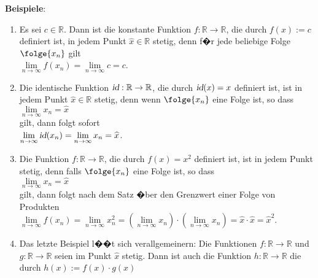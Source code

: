 \noindent
\textbf{Beispiele}:
\begin{enumerate}
\item Es sei $c \in \mathbb{R}$.  Dann ist die konstante Funktion
      $f: \mathbb{R} \rightarrow \mathbb{R}$, die durch $f(x) := c$ definiert ist, in
      jedem Punkt $\widehat{x}\in\mathbb{R}$ stetig, denn f�r jede beliebige Folge $\folge{x_n}$ gilt 
      \\[0.2cm]
      \hspace*{1.3cm}      
      $\lim\limits_{n\rightarrow\infty} f(x_n) = \lim\limits_{n\rightarrow\infty} c = c$.
\item Die identische Funktion $\textsl{id}:\mathbb{R} \rightarrow \mathbb{R}$, die durch 
      $\textsl{id}(x) = x$ definiert ist, ist in jedem Punkt $\widehat{x}\in\mathbb{R}$ stetig,
      denn wenn $\folge{x_n}$ eine Folge ist, so dass
      \\[0.2cm]
      \hspace*{1.3cm}      
      $\lim\limits_{n\rightarrow\infty} x_n = \widehat{x}$
      \\[0.2cm]
      gilt, dann folgt sofort 
      \\[0.2cm]
      \hspace*{1.3cm}      
      $\lim\limits_{n\rightarrow\infty} \textsl{id}(x_n) = \lim\limits_{n\rightarrow\infty} x_n = \widehat{x}$.
\item Die Funktion $f: \mathbb{R} \rightarrow \mathbb{R}$, die durch
      $f(x) = x^2$ definiert ist, ist in jedem Punkt stetig, denn falls
      $\folge{x_n}$ eine Folge ist, so dass 
      \\[0.2cm]
      \hspace*{1.3cm}      
      $\lim\limits_{n\rightarrow\infty} x_n = \widehat{x}$ 
      \\[0.2cm]
      gilt, dann folgt nach dem Satz �ber den Grenzwert einer Folge von Produkten
      \\[0.2cm]
      \hspace*{1.3cm}      
      $\lim\limits_{n\rightarrow\infty} f(x_n) = 
       \lim\limits_{n\rightarrow\infty} x_n^2 = 
       \left(\lim\limits_{n\rightarrow\infty} x_n\right) \cdot\left(\lim\limits_{n\rightarrow\infty} x_n\right) =
       \widehat{x} \cdot \widehat{x} = \widehat{x}^2$.
\item Das letzte Beispiel l��t sich verallgemeinern: Die Funktionen
      $f:\mathbb{R} \rightarrow \mathbb{R}$ und $g:\mathbb{R} \rightarrow \mathbb{R}$
      seien im Punkt $\widehat{x}$ stetig.  Dann ist auch die Funktion
      $h: \mathbb{R} \rightarrow \mathbb{R}$ die durch $h(x) := f(x) \cdot g(x)$

\end{enumerate}
